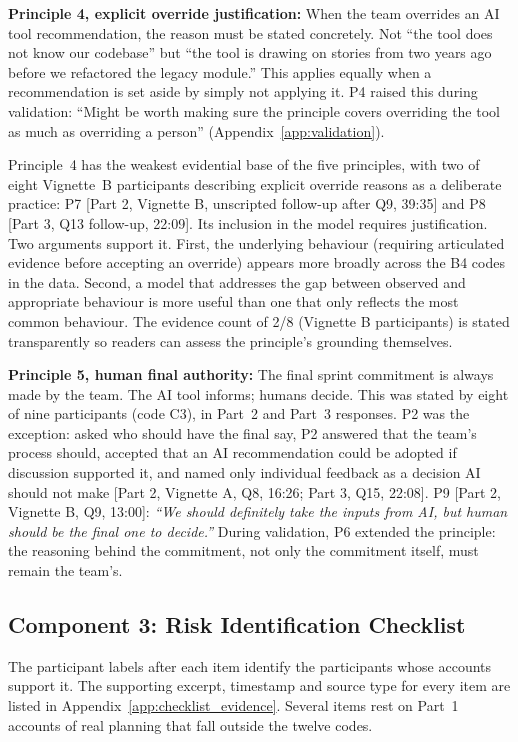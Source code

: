 \documentclass[a4paper,twoside]{bth}
\begin{document}
\textbf{Principle 4, explicit override justification:} When the team overrides an AI tool recommendation, the reason must be stated concretely. Not ``the tool does not know our codebase'' but ``the tool is drawing on stories from two years ago before we refactored the legacy module.'' This applies equally when a recommendation is set aside by simply not applying it. P4 raised this during validation: ``Might be worth making sure the principle covers overriding the tool as much as overriding a person'' (Appendix~\ref{app:validation}).

Principle~4 has the weakest evidential base of the five principles, with two of eight Vignette~B participants describing explicit override reasons as a deliberate practice: P7 [Part 2, Vignette B, unscripted follow-up after Q9, 39:35] and P8 [Part 3, Q13 follow-up, 22:09]. Its inclusion in the model requires justification. Two arguments support it. First, the underlying behaviour (requiring articulated evidence before accepting an override) appears more broadly across the B4 codes in the data. Second, a model that addresses the gap between observed and appropriate behaviour is more useful than one that only reflects the most common behaviour. The evidence count of 2/8 (Vignette B participants) is stated transparently so readers can assess the principle's grounding themselves.

\textbf{Principle 5, human final authority:} The final sprint commitment is always made by the team. The AI tool informs; humans decide. This was stated by eight of nine participants (code C3), in Part~2 and Part~3 responses. P2 was the exception: asked who should have the final say, P2 answered that the team's process should, accepted that an AI recommendation could be adopted if discussion supported it, and named only individual feedback as a decision AI should not make [Part 2, Vignette A, Q8, 16:26; Part 3, Q15, 22:08]. P9 [Part 2, Vignette B, Q9, 13:00]: \textit{``We should definitely take the inputs from AI, but human should be the final one to decide.''} During validation, P6 extended the principle: the reasoning behind the commitment, not only the commitment itself, must remain the team's.

\subsection{Component 3: Risk Identification Checklist}

The participant labels after each item identify the participants whose accounts support it. The supporting excerpt, timestamp and source type for every item are listed in Appendix~\ref{app:checklist_evidence}. Several items rest on Part~1 accounts of real planning that fall outside the twelve codes.
\end{document}
